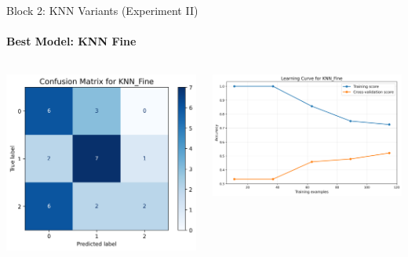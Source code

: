 \documentclass[9pt]{beamer}
\begin{document}
    \begin{frame}{Block 2: KNN Variants (Experiment II)}
    \framesubtitle{Best Model: KNN Fine}
    \begin{columns}
        \begin{column}{0.33\textwidth}
            \centering
            \includegraphics[width=\textwidth]{code/ResultsMainAugZip/plots/Block2_KNN_Variants_Experiment_II/confusion_matrix_KNN_Fine.png}
        \end{column}
        \begin{column}{0.33\textwidth}
            \centering
            \includegraphics[width=\textwidth]{code/ResultsMainAugZip/plots/Block2_KNN_Variants_Experiment_II/learning_curve_KNN_Fine.png}

\end{column}
\end{columns}
\end{frame}
\end{document}
